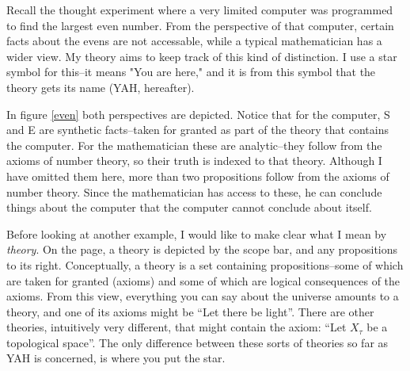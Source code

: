 \documentclass[12pt]{article}
\begin{document}
\begin{flushleft}
Recall the thought experiment where a very limited computer was programmed to find the largest even number.
From the perspective of that computer, certain facts about the evens are not accessable, while a typical mathematician has a wider view.
My theory aims to keep track of this kind of distinction.
I use a star symbol for this--it means "You are here," and it is from this symbol that the theory gets its name (YAH, hereafter).

In figure \ref{even} both perspectives are depicted.
Notice that for the computer, S and E are synthetic facts--taken for granted as part of the theory that contains the computer.
For the mathematician these are analytic--they follow from the axioms of number theory, so their truth is indexed to that theory.
Although I have omitted them here, more than two propositions follow from the axioms of number theory.
Since the mathematician has access to these, he can conclude things about the computer that the computer cannot conclude about itself.

Before looking at another example, I would like to make clear what I mean by \textit{theory}.
On the page, a theory is depicted by the scope bar, and any propositions to its right.
Conceptually, a theory is a set containing propositions--some of which are taken for granted (axioms) and some of which are logical consequences of the axioms.
From this view, everything you can say about the universe amounts to a theory, and one of its axioms might be ``Let there be light''.
There are other theories, intuitively very different, that might contain the axiom: ``Let $X_\tau$ be a topological space''.
The only difference between these sorts of theories so far as YAH is concerned, is where you put the star.


\end{flushleft}
\end{document}
